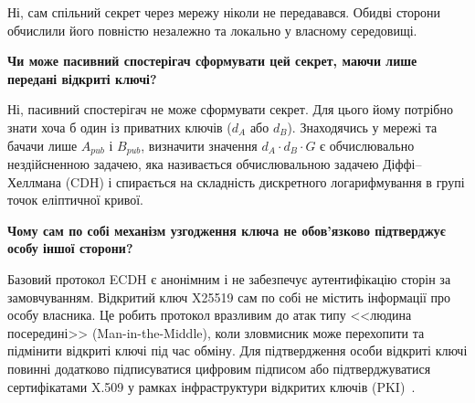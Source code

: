 Ні, сам спільний секрет через мережу ніколи не передавався. Обидві сторони обчислили його повністю
незалежно та локально у власному середовищі.

\textbf{Чи може пасивний спостерігач сформувати цей секрет, маючи лише передані відкриті ключі?}

Ні, пасивний спостерігач не може сформувати секрет. Для цього йому потрібно знати хоча б один із
приватних ключів ($d_A$ або $d_B$). Знаходячись у мережі та бачачи лише $A_{pub}$ і $B_{pub}$, визначити
значення $d_A \cdot d_B \cdot G$ є обчислювально нездійсненною задачею, яка називається
обчислювальною задачею Діффі--Хеллмана (CDH) і спирається на складність дискретного логарифмування в
групі точок еліптичної кривої.

\textbf{Чому сам по собі механізм узгодження ключа не обов'язково підтверджує особу іншої сторони?}

Базовий протокол ECDH є анонімним і не забезпечує аутентифікацію сторін за замовчуванням. Відкритий
ключ X25519 сам по собі не містить інформації про особу власника. Це робить протокол вразливим до атак
типу <<людина посередині>> (Man-in-the-Middle), коли зловмисник може перехопити та підмінити відкриті
ключі під час обміну. Для підтвердження особи відкриті ключі повинні додатково підписуватися цифровим
підписом або підтверджуватися сертифікатами X.509 у рамках інфраструктури відкритих ключів
(PKI)~\cite{RFC7748,NIST80057}.

